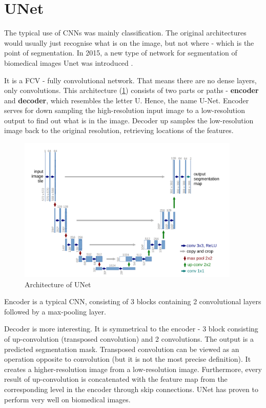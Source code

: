 \section{UNet}
The typical use of CNNs was mainly classification. The original architectures would usually just recognise what is on the image, but not where - which is the point of segmentation. In 2015, a new type of network for segmentation of biomedical images Unet was introduced \cite{unet2015}.

It is a FCV - fully convolutional network. That means there are no dense layers, only convolutions. This architecture (\ref{fig:unet}) consists of two parts or paths - \textbf{encoder} and \textbf{decoder}, which resembles the letter U. Hence, the name U-Net. Encoder serves for down sampling the high-resolution input image to a low-resolution output to find out what is in the image. Decoder up samples the low-resolution image back to the original resolution, retrieving locations of the features.

\begin{figure}[ht!]
    \centering
    \includegraphics[width=300pt]{images/unet.png}
    \caption[Architecture of UNet]{Architecture of UNet \cite{unet2015}}
    \label{fig:unet}
\end{figure}

Encoder is a typical CNN, consisting of 3 blocks containing 2 convolutional layers followed by a max-pooling layer.

Decoder is more interesting. It is symmetrical to the encoder - 3 block consisting of up-convolution (transposed convolution) and 2 convolutions. The output is a predicted segmentation mask. Transposed convolution can be viewed as an operation opposite to convolution (but it is not the most precise definition). It creates a higher-resolution image from a low-resolution image. Furthermore, every result of up-convolution is concatenated with the feature map from the corresponding level in the encoder through skip connections. UNet has proven to perform very well on biomedical images.  

\pagebreak
